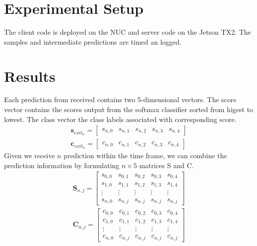 \section{Experimental Setup}

The client code is deployed on the NUC and server code on the Jetson TX2. The samples and intermediate predictions are timed an logged. 

\section{Results}

Each prediction from received contains two 5-dimensional vectors.  The score vector contains the scores output from the softmax classifier sorted from higest to lowest. The class vector the class labels associated with corresponding score.
\begin{align*}
\mathbf{s}_{exit_n} = \begin{bmatrix}
s_{n,0} & s_{n,1} & s_{n,2} & s_{n,3} & s_{n,4}
\end{bmatrix} \\
\mathbf{c}_{exit_n} = \begin{bmatrix}
c_{n,0} & c_{n,1} & c_{n,2} & c_{n,3} & c_{n,4}
\end{bmatrix}
\end{align*}
Given we receive $n$ prediction within the time frame, we can combine the prediction information by formulating $n \times 5$ matrices S and C.
\begin{align*}
\mathbf{S}_{n,j} = \begin{bmatrix}
s_{0,0} & s_{0,1} & s_{0,2} & s_{0,3} & s_{0,4} \\
s_{1,0} & s_{1,1} & s_{1,2} & s_{1,3} & s_{1,4} \\
\vdots & \vdots & \vdots & \vdots & \vdots \\
s_{n,0} & s_{n,j} & s_{n,j} & s_{n,j} & s_{n,j}
\end{bmatrix} \\
\mathbf{C}_{n,j}= \begin{bmatrix}
c_{0,0} & c_{0,1} & c_{0,2} & c_{0,3} & c_{0,4} \\
c_{1,0} & c_{1,1} & c_{1,2} & c_{1,3} & c_{1,4} \\
\vdots & \vdots & \vdots & \vdots & \vdots \\
c_{n,0} & c_{n,j} & c_{n,j} & c_{n,j} & c_{n,j}
\end{bmatrix}
\end{align*}

